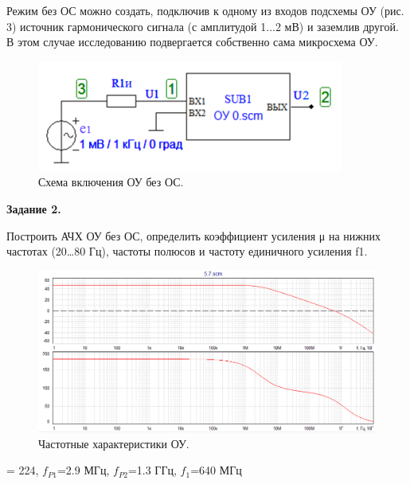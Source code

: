 \documentclass[a4paper,14pt]{extarticle}
\begin{document}
    Режим без ОС можно создать, подключив к одному из входов подсхемы ОУ 
    (рис. 3) источник гармонического сигнала (с амплитудой 1...2 мВ) и 
    заземлив другой. В этом случае исследованию подвергается 
    собственно сама микросхема ОУ.

    \begin{figure}[h!]
        \begin{center}
            \includegraphics{4.png}
        \end{center}
        \caption{Схема включения ОУ без ОС.}
    \end{figure}
    
    \begin{center}
        \textbf{Задание 2.}
    \end{center}

    Построить АЧХ ОУ без ОС, определить коэффициент усиления μ на нижних 
    частотах (20…80 Гц), частоты полюсов и частоту единичного усиления f1.

    \begin{figure}[h!]
        \begin{center}
            \includegraphics[scale=0.6]{5.png}
        \end{center}
        \caption{Частотные характеристики ОУ.}
    \end{figure}

    \begin{center}
        \mu = 224, $f_{P1}$=2.9 МГц, $f_{P2}$=1.3 ГГц, $f_1$=640 МГц
    \end{center}
\end{document}
